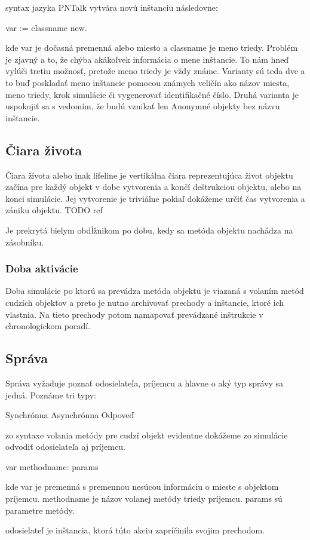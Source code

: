 syntax jazyka PNTalk vytvára novú inštanciu následovne:

var := classname new.

kde var je dočasná premenná alebo miesto a classname je meno triedy. Problém je zjavný a to, že chýba akákoľvek informácia o mene inštancie. To nám hneď vylúči tretiu možnosť, pretože meno triedy je vždy známe. Varianty sú teda dve a to buď poskladať meno inštancie pomocou známych veličín ako názov miesta, meno triedy, krok simulácie či vygenerovať identifikačné číslo. Druhá varianta je uspokojiť sa s vedomím, že budú vznikať len Anonymné objekty bez názvu inštancie.

\subsection*{Čiara života}
Čiara života alebo inak lifeline je vertikálna čiara reprezentujúca život objektu začína pre každý objekt v dobe vytvorenia a končí deštrukciou objektu, alebo na konci simulácie. Jej vytvorenie je triviálne pokiaľ dokážeme určiť čas vytvorenia a zániku objektu. TODO ref

Je prekrytá bielym obdĺžnikom po dobu, kedy sa metóda objektu nachádza na zásobníku.

\subsubsection*{Doba aktivácie}
Doba simulácie po ktorú sa prevádza metóda objektu je viazaná s volaním metód cudzích objektov a preto je nutno archivovať prechody a inštancie, ktoré ich vlastnia. Na tieto prechody potom namapovať prevádzané inštrukcie v chronologickom poradí.

\subsection*{Správa}
Správa vyžaduje poznať odosielateľa, príjemcu a hlavne o aký typ správy sa jedná. Poznáme tri typy:

Synchrónna
Asynchrónna
Odpoveď

zo syntaxe volania metódy pre cudzí objekt evidentne dokážeme zo simulácie odvodiť odosielateľa aj príjemcu.

var methodname: params

kde var je premenná s premennou nesúcou informáciu o mieste s objektom príjemcu. methodname je názov volanej metódy triedy príjemcu. params sú parametre metódy.

odosielateľ je inštancia, ktorá túto akciu zapríčinila svojim prechodom.

